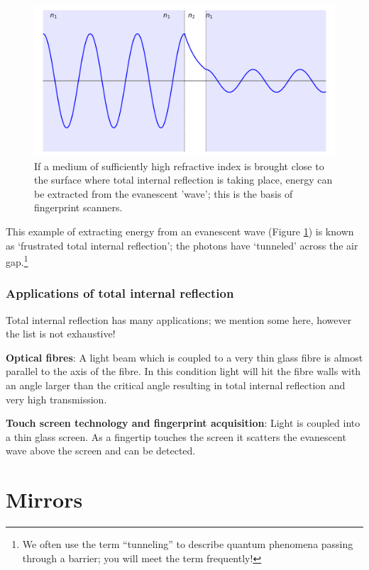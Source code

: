 \documentclass[
]{book}
\begin{document}
\begin{figure}

{\centering \includegraphics[width=0.7\linewidth]{visualisations/ch14-evansecent2} 

}

\caption{If a medium of sufficiently high refractive index is brought close to the surface where total internal reflection is taking place, energy can be extracted from the evanescent 'wave'; this is the basis of fingerprint scanners.}\label{fig:ch14-evanescentwave2}
\end{figure}

This example of extracting energy from an evanescent wave (Figure \ref{fig:ch14-evanescentwave2}) is known as `frustrated total internal reflection'; the photons have `tunneled' across the air gap.\footnote{We often use the term ``tunneling'' to describe quantum phenomena passing through a barrier; you will meet the term frequently!}

\hypertarget{sec:ch14-tirapplications}{%
\subsection{Applications of total internal reflection}\label{sec:ch14-tirapplications}}

Total internal reflection has many applications; we mention some here, however the list is not exhaustive!

\textbf{Optical fibres}: A light beam which is coupled to a very thin glass fibre is almost parallel to the axis of the fibre. In this condition light will hit the fibre walls with an angle larger than the critical angle resulting in total internal reflection and very high transmission.

\textbf{Touch screen technology and fingerprint acquisition}: Light is coupled into a thin glass screen. As a fingertip touches the screen it scatters the evanescent wave above the screen and can be detected.

\hypertarget{sec:ch15-mirrors}{%
\chapter{Mirrors}\label{sec:ch15-mirrors}}
\end{document}
